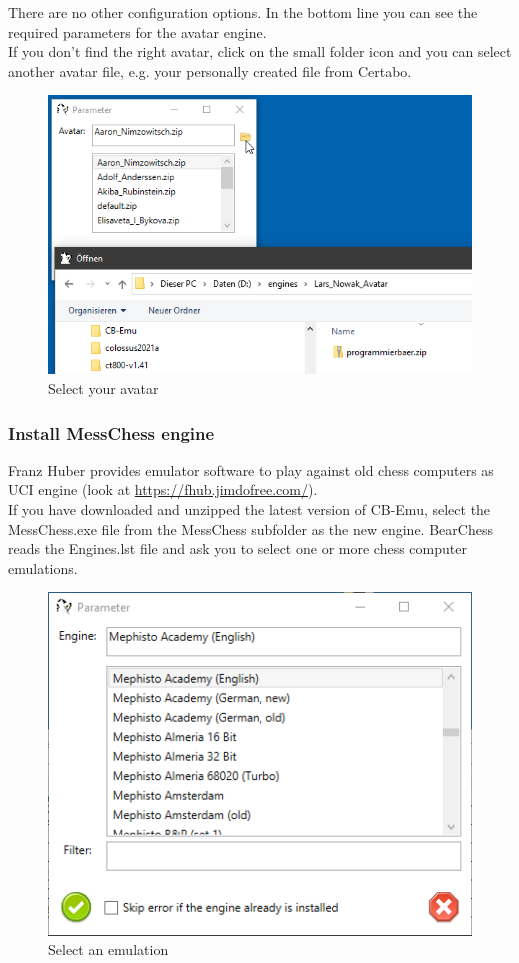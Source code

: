 \documentclass[11pt,a4paper]{article}
\begin{document}
There are no other configuration options. In the bottom line you can see the required parameters for the avatar engine.\\
If you don't find the right avatar, click on the small folder icon and you can select another avatar file, e.g. your personally created file from Certabo.

\begin{figure}[H]
	\centering
	\includegraphics[scale=0.7]{avatar4.png}
	\caption{Select your avatar}
	\label{fig:Avatar4}
\end{figure}

\subsubsection{Install MessChess engine}
Franz Huber provides emulator software to play against old chess computers as UCI engine (look at \url{https://fhub.jimdofree.com/}).\\
If you have downloaded and unzipped the latest version of CB-Emu, select the MessChess.exe file from the MessChess subfolder as the new engine. BearChess reads the Engines.lst file and ask you to select one or more chess computer emulations.

\begin{figure}[H]
	\centering
	\includegraphics[scale=0.8]{MessChess1.png}
	\caption{Select an emulation}
	\label{fig:MessChess1}
\end{figure}
\end{document}
